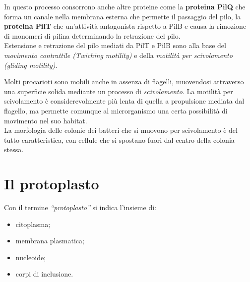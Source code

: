 \documentclass[11pt]{book}
\begin{document}
In questo processo consorrono anche altre proteine come la \textbf{proteina PilQ} che forma un canale nella membrana esterna che permette il passaggio del pilo, la \textbf{proteina PilT} che un'attività antagonista rispetto a PilB e causa la rimozione di monomeri di pilina determinando la retrazione del pilo.\\
Estensione e retrazione del pilo mediati da PilT e PilB sono alla base del \emph{movimento contrattile (Twiching motility)} e della \emph{motilità per scivolamento (gliding motility)}.


\vspace{1em}
Molti procarioti sono mobili anche in assenza di flagelli, muovendosi attraverso una superficie solida mediante un processo di \emph{scivolamento}. La motilità per scivolamento è considerevolmente più lenta di quella a propulsione mediata dal flagello, ma permette comunque al microrganismo una certa possibilità di movimento nel suo habitat.\\
La morfologia delle colonie dei batteri che si muovono per scivolamento è del tutto caratteristica, con cellule che si spostano fuori dal centro della colonia stessa.

\chapter{Il protoplasto}

Con il termine \emph{``protoplasto''} si indica l'insieme di:
\begin{itemize}
\item citoplasma; 
\item membrana plasmatica;
\item nucleoide;
\item corpi di inclusione.
\end{itemize}
\end{document}
